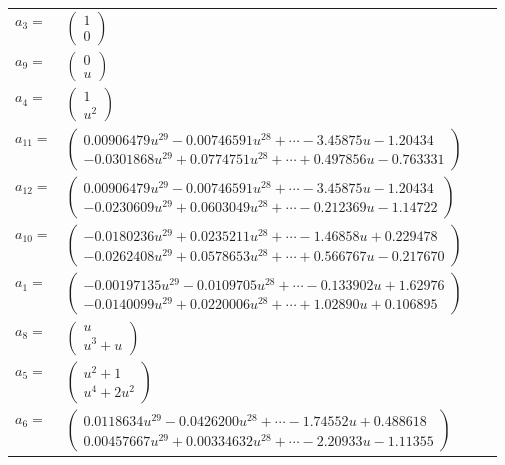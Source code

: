 \documentclass[1p]{elsarticle_modified}
\theoremstyle{definition}
\begin{document}
\begin{tabular}{m{7pt} m{180pt} m{7pt} m{180pt} }
\flushright $a_{3}=$&$\begin{pmatrix}1\\0\end{pmatrix}$ \\
\flushright $a_{9}=$&$\begin{pmatrix}0\\u\end{pmatrix}$ \\
\flushright $a_{4}=$&$\begin{pmatrix}1\\u^2\end{pmatrix}$ \\
\flushright $a_{11}=$&$\begin{pmatrix}0.00906479 u^{29}-0.00746591 u^{28}+\cdots-3.45875 u-1.20434\\-0.0301868 u^{29}+0.0774751 u^{28}+\cdots+0.497856 u-0.763331\end{pmatrix}$ \\
\flushright $a_{12}=$&$\begin{pmatrix}0.00906479 u^{29}-0.00746591 u^{28}+\cdots-3.45875 u-1.20434\\-0.0230609 u^{29}+0.0603049 u^{28}+\cdots-0.212369 u-1.14722\end{pmatrix}$ \\
\flushright $a_{10}=$&$\begin{pmatrix}-0.0180236 u^{29}+0.0235211 u^{28}+\cdots-1.46858 u+0.229478\\-0.0262408 u^{29}+0.0578653 u^{28}+\cdots+0.566767 u-0.217670\end{pmatrix}$ \\
\flushright $a_{1}=$&$\begin{pmatrix}-0.00197135 u^{29}-0.0109705 u^{28}+\cdots-0.133902 u+1.62976\\-0.0140099 u^{29}+0.0220006 u^{28}+\cdots+1.02890 u+0.106895\end{pmatrix}$ \\
\flushright $a_{8}=$&$\begin{pmatrix}u\\u^3+u\end{pmatrix}$ \\
\flushright $a_{5}=$&$\begin{pmatrix}u^2+1\\u^4+2 u^2\end{pmatrix}$ \\
\flushright $a_{6}=$&$\begin{pmatrix}0.0118634 u^{29}-0.0426200 u^{28}+\cdots-1.74552 u+0.488618\\0.00457667 u^{29}+0.00334632 u^{28}+\cdots-2.20933 u-1.11355\end{pmatrix}$ \\

\end{tabular}
\end{document}
